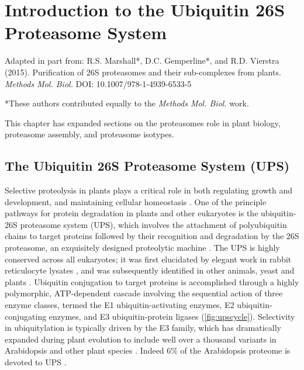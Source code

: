\chapter{Introduction to the Ubiquitin 26S Proteasome System}

Adapted in part from: R.S. Marshall*, D.C. Gemperline*, and R.D. Vierstra (2015). Purification of 26S proteasomes and their sub-complexes from plants. \textit{Methods Mol. Biol.} DOI: 10.1007/978-1-4939-6533-5

\noindent
*These authors contributed equally to the \textit{Methods Mol. Biol.} work.

\noindent
This chapter has expanded sections on the proteasomes role in plant biology, proteasome assembly, and proteasome isotypes. 

\section{The Ubiquitin 26S Proteasome System (UPS)}
	Selective proteolysis in plants plays a critical role in both regulating growth and development, and maintaining cellular homeostasis \citep{nelson14, smalle04, vierstra93, vierstra09}.  One of the principle pathways for protein degradation in plants and other eukaryotes is the ubiquitin-26S proteasome system (UPS), which involves the attachment of polyubiquitin chains to target proteins followed by their recognition and degradation by the 26S proteasome, an exquisitely designed proteolytic machine \citep{bhattacharyya14, finley09, vierstra09}.  The UPS is highly conserved across all eukaryotes; it was first elucidated by elegant work in rabbit reticulocyte lysates \citep{ciechanover80, ciechanover80-frAQB, etlinger77, hershko80, wilkinson80}, and was subsequently identified in other animals, yeast and plants \citep{ciechanover84, finley84, finley87, glotzer91, hochstrasser91, shanklin87}.  Ubiquitin conjugation to target proteins is accomplished through a highly polymorphic, ATP-dependent cascade involving the sequential action of three enzyme classes, termed the E1 ubiquitin-activating enzymes, E2 ubiquitin-conjugating enzymes, and E3 ubiquitin-protein ligases \citep{berndsen14, smalle04, vierstra09} (\ref{fig:upscycle}).  Selectivity in ubiquitylation is typically driven by the E3 family, which has dramatically expanded during plant evolution to include well over a thousand variants in Arabidopsis and other plant species \citep{hua13, hua11}. Indeed 6\% of the Arabidopsis proteome is devoted to UPS \citep{smalle04}. 


